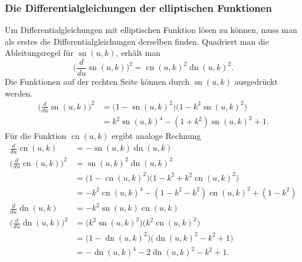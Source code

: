 \subsubsection{Die Differentialgleichungen der elliptischen Funktionen}
Um Differentialgleichungen mit elliptischen Funktion lösen zu
können, muss man als erstes die Differentialgleichungen derselben
finden.
Quadriert man die Ableitungsregel für $\operatorname{sn}(u,k)$, erhält
man
\[
\biggl(\frac{d}{du}\operatorname{sn}(u,k)\biggr)^2
=
\operatorname{cn}(u,k)^2 \operatorname{dn}(u,k)^2.
\]
Die Funktionen auf der rechten Seite können durch $\operatorname{sn}(u,k)$
ausgedrückt werden.
\begin{align*}
\biggl(\frac{d}{du}\operatorname{sn}(u,k)\biggr)^2
&=
\biggl(
1-\operatorname{sn}(u,k)^2
\biggr)
\biggl(
1-k^2 \operatorname{sn}(u,k)^2
\biggr)
\\
&=
k^2\operatorname{sn}(u,k)^4 
-(1+k^2)
\operatorname{sn}(u,k)^2 
+1.
\end{align*}
Für die Funktion $\operatorname{cn}(u,k)$ ergibt analoge Rechnung
\begin{align*}
\frac{d}{du}\operatorname{cn}(u,k)
&=
-\operatorname{sn}(u,k) \operatorname{dn}(u,k)
\\
\biggl(\frac{d}{du}\operatorname{cn}(u,k)\biggr)^2
&=
\operatorname{sn}(u,k)^2 \operatorname{dn}(u,k)^2
\\
&=
\biggl(1-\operatorname{cn}(u,k)^2\biggr)
\biggl(1-k^2+k^2 \operatorname{cn}(u,k)^2\biggr)
\\
&=
-k^2\operatorname{cn}(u,k)^4
-
(1-k^2-k^2)\operatorname{cn}(u,k)^2
+
(1-k^2)
\\
\frac{d}{du}\operatorname{dn}(u,k)
&=
-k^2\operatorname{sn}(u,k)\operatorname{cn}(u,k)
\\
\biggl(
\frac{d}{du}\operatorname{dn}(u,k)
\biggr)^2
&=
\bigl(k^2 \operatorname{sn}(u,k)^2\bigr)
\bigl(k^2 \operatorname{cn}(u,k)^2\bigr)
\\
&=
\biggl(
1-\operatorname{dn}(u,k)^2
\biggr)
\biggl(
\operatorname{dn}(u,k)^2-k^2+1
\biggr)
\\
&=
-\operatorname{dn}(u,k)^4
-
2\operatorname{dn}(u,k)^2
-k^2+1.
\end{align*}
